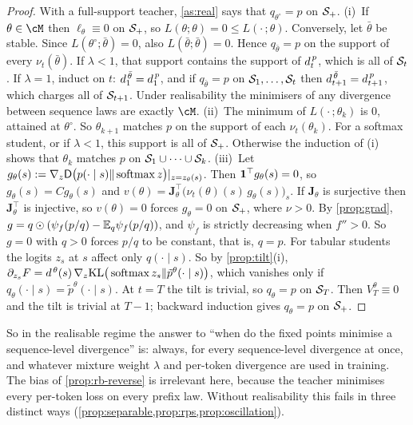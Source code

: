 \begin{proof}
With a full-support teacher, \cref{as:real} says that $q_{\theta^\circ}=p$ on $\mathcal{S}_+$. (i)~If $\theta\in\cM$ then $\ell_\theta\equiv0$ on $\mathcal{S}_+$, so
$L(\theta;\theta)=0\le L(\cdot\,;\theta)$. Conversely, let $\bar\theta$ be stable. Since $L(\theta^\circ;\bar\theta)=0$, also $L(\bar\theta;\bar\theta)=0$. Hence
$q_{\bar\theta}=p$ on the support of every $\nu_t(\bar\theta)$. If $\lambda<1$, that support contains the support of $d^{\,p}_{t}$, which is all of
$\mathcal{S}_t$. If $\lambda=1$, induct on $t$: $d^{\,\bar\theta}_1=d^{\,p}_{1}$, and if $q_{\bar\theta}=p$ on $\mathcal{S}_1,\dots,\mathcal{S}_t$ then $d^{\,\bar\theta}_{t+1}=d^{\,p}_{t+1}$, which charges all of
$\mathcal{S}_{t+1}$. Under realisability the minimisers of any divergence between sequence laws are exactly $\cM$.
(ii)~The minimum of $L(\cdot\,;\theta_k)$ is $0$, attained at $\theta^\circ$. So $\theta_{k+1}$ matches $p$ on the support of each $\nu_t(\theta_k)$. For a
softmax student, or if $\lambda<1$, this support is all of $\mathcal{S}_+$. Otherwise the induction of (i) shows that $\theta_k$ matches $p$ on
$\mathcal{S}_1\cup\dots\cup\mathcal{S}_k$. (iii)~Let $g_\theta(s):=\nabla_z\mathsf D\big(p(\cdot\mid s)\|\operatorname{softmax} z\big)|_{z=z_\theta(s)}$. Then $\mathbf{1}^\top g_\theta(s)=0$, so $g_\theta(s)=Cg_\theta(s)$ and
$v(\theta)=\mathbf J_\theta^\top\big(\nu_t(\theta)(s)\,g_\theta(s)\big)_{s}$. If $\mathbf J_\theta$ is surjective then $\mathbf J_\theta^\top$ is injective, so $v(\theta)=0$ forces $g_\theta=0$ on
$\mathcal{S}_+$, where $\nu>0$. By \cref{prop:grad}, $g=q\odot(\psi_f(p/q)-\mathbb{E}_q\psi_f(p/q))$, and $\psi_f$ is strictly decreasing when $f''>0$. So
$g=0$ with $q>0$ forces $p/q$ to be constant, that is, $q=p$. For tabular students the logits $z_s$ at $s$ affect only
$q(\cdot\mid s)$. So by \cref{prop:tilt}(i), $\partial_{z_s}F=d^{\,\theta}(s)\,\nabla_z\mathrm{KL}\big(\operatorname{softmax} z_s\|\tilde p^\theta(\cdot\mid s)\big)$, which vanishes only if
$q_\theta(\cdot\mid s)=\tilde p^\theta(\cdot\mid s)$. At $t=T$ the tilt is trivial, so $q_\theta=p$ on $\mathcal{S}_T$. Then $V^\theta_T\equiv0$ and the tilt is trivial at
$T-1$; backward induction gives $q_\theta=p$ on $\mathcal{S}_+$.
\end{proof}
\noindent
So in the realisable regime the answer to ``when do the fixed points minimise a sequence-level divergence'' is:
always, for every sequence-level divergence at once, and whatever mixture weight $\lambda$ and per-token divergence are used
in training. The bias of \cref{prop:rb-reverse} is irrelevant here, because the teacher minimises every per-token
loss on every prefix law. Without realisability this fails in three distinct ways (\cref{prop:separable,prop:rps,prop:oscillation}).

